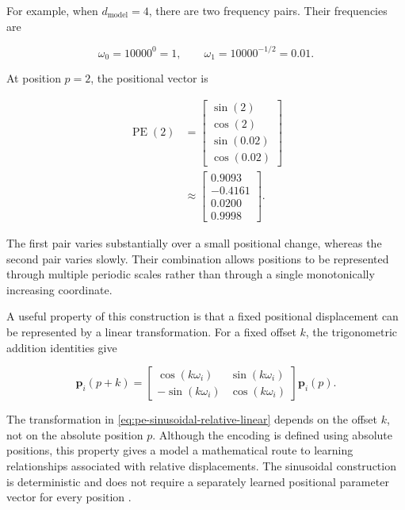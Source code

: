 For example, when \(d_{\mathrm{model}}=4\), there are two frequency pairs.
Their frequencies are

\begin{equation}
    \omega_0=10000^0=1,
    \qquad
    \omega_1=10000^{-1/2}=0.01.
    \label{eq:pe-sinusoidal-numeric-frequencies}
\end{equation}

At position \(p=2\), the positional vector is

\begin{align}
    \operatorname{PE}(2)
    &=
    \begin{bmatrix}
        \sin(2)\\
        \cos(2)\\
        \sin(0.02)\\
        \cos(0.02)
    \end{bmatrix}\\
    &\approx
    \begin{bmatrix}
        0.9093\\
        -0.4161\\
        0.0200\\
        0.9998
    \end{bmatrix}.
    \label{eq:pe-sinusoidal-numeric-example}
\end{align}

The first pair varies substantially over a small positional change, whereas
the second pair varies slowly. Their combination allows positions to be
represented through multiple periodic scales rather than through a single
monotonically increasing coordinate.

A useful property of this construction is that a fixed positional
displacement can be represented by a linear transformation. For a fixed
offset \(k\), the trigonometric addition identities give

\begin{equation}
    \mathbf{p}_i(p+k)=
    \begin{bmatrix}
        \cos(k\omega_i)&\sin(k\omega_i)\\
        -\sin(k\omega_i)&\cos(k\omega_i)
    \end{bmatrix}
    \mathbf{p}_i(p).
    \label{eq:pe-sinusoidal-relative-linear}
\end{equation}

The transformation in \cref{eq:pe-sinusoidal-relative-linear} depends on
the offset \(k\), not on the absolute position \(p\). Although the encoding
is defined using absolute positions, this property gives a model a
mathematical route to learning relationships associated with relative
displacements. The sinusoidal construction is deterministic and does not
require a separately learned positional parameter vector for every position
\parencite{zhou2024rethinking}.

